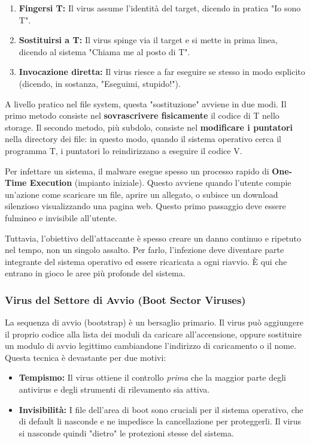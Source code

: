 \documentclass{article}
\begin{document}
\begin{enumerate}
    \item \textbf{Fingersi T:} Il virus assume l'identità del target, dicendo in pratica "Io sono T".
    \item \textbf{Sostituirsi a T:} Il virus spinge via il target e si mette in prima linea, dicendo al sistema "Chiama me al posto di T".
    \item \textbf{Invocazione diretta:} Il virus riesce a far eseguire se stesso in modo esplicito (dicendo, in sostanza, "Eseguimi, stupido!").
\end{enumerate}

A livello pratico nel file system, questa "sostituzione" avviene in due modi. Il primo metodo consiste nel \textbf{sovrascrivere fisicamente} il codice di T nello storage. Il secondo metodo, più subdolo, consiste nel \textbf{modificare i puntatori} nella directory dei file: in questo modo, quando il sistema operativo cerca il programma T, i puntatori lo reindirizzano a eseguire il codice V.

Per infettare un sistema, il malware esegue spesso un processo rapido di \textbf{One-Time Execution} (impianto iniziale). Questo avviene quando l'utente compie un'azione come scaricare un file, aprire un allegato, o subisce un download silenzioso visualizzando una pagina web. Questo primo passaggio deve essere fulmineo e invisibile all'utente.

Tuttavia, l'obiettivo dell'attaccante è spesso creare un danno continuo e ripetuto nel tempo, non un singolo assalto. Per farlo, l'infezione deve diventare parte integrante del sistema operativo ed essere ricaricata a ogni riavvio. È qui che entrano in gioco le aree più profonde del sistema.

\subsubsection*{Virus del Settore di Avvio (Boot Sector Viruses)}

La sequenza di avvio (bootstrap) è un bersaglio primario. Il virus può aggiungere il proprio codice alla lista dei moduli da caricare all'accensione, oppure sostituire un modulo di avvio legittimo cambiandone l'indirizzo di caricamento o il nome. Questa tecnica è devastante per due motivi:

\begin{itemize}
    \item \textbf{Tempismo:} Il virus ottiene il controllo \textit{prima} che la maggior parte degli antivirus e degli strumenti di rilevamento sia attiva.
    \item \textbf{Invisibilità:} I file dell'area di boot sono cruciali per il sistema operativo, che di default li nasconde e ne impedisce la cancellazione per proteggerli. Il virus si nasconde quindi "dietro" le protezioni stesse del sistema.
\end{itemize}
\end{document}
